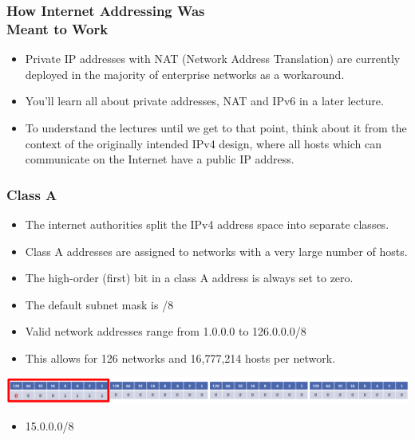 \documentclass[pdflatex,compress]{beamer}
\begin{document}
\begin{frame}
	\frametitle{How Internet Addressing Was\\Meant to Work}
	\begin{itemize}
		\item Private IP addresses with NAT (Network Address Translation) are currently deployed in the majority of enterprise networks as a workaround.
		\item You’ll learn all about private addresses, NAT and IPv6 in a later lecture.
		\item To understand the lectures until we get to that point, think about it from the context of the originally intended IPv4 design, where all hosts which can communicate on the Internet have a public IP address.
	\end{itemize}
\end{frame}

\begin{frame}
	\frametitle{Class A}
	\begin{itemize}
		\item The internet authorities split the IPv4 address space into separate classes.
		\item Class A addresses are assigned to networks with a very large number of hosts.
		\item The high-order (first) bit in a class A address is always set to zero.
		\item The default subnet mask is /8
		\item Valid network addresses range from 1.0.0.0 to 126.0.0.0/8
		\item This allows for 126 networks and 16,777,214 hosts per network.
	\end{itemize}

	\begin{center}
		\includegraphics[width=1\linewidth]{img/img02}
	\end{center}

	\begin{itemize}
		\item 15.0.0.0/8
	\end{itemize}
\end{frame}
\end{document}
